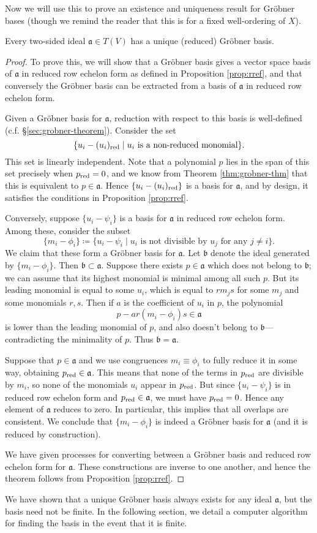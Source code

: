 Now we will use this to prove an existence and uniqueness result for Gr\"obner bases (though we remind the reader that this is for a fixed well-ordering of $X$).
\begin{thm}\label{thm:exist+unique}
	Every two-sided ideal $\mathfrak{a}\in T(V)$ has a unique (reduced) Gr\"obner basis.
\end{thm}
\begin{proof}
	To prove this, we will show that a Gr\"obner basis gives a vector space basis of $\mathfrak{a}$ in reduced row echelon form as defined in Proposition \ref{prop:rref}, and that conversely the Gr\"obner basis can be extracted from a basis of $\mathfrak{a}$ in reduced row echelon form.
	
	Given a Gr\"obner basis for $\mathfrak{a}$, reduction with respect to this basis is well-defined (c.f. \S\ref{sec:grobner-theorem}). Consider the set
	\[
		\{u_i - (u_i)_{\mathrm{red}} \mid u_i \text{ is a non-reduced monomial}\}.
	\]
	This set is linearly independent. Note that a polynomial $p$ lies in the span of this set precisely when $p_{\mathrm{red}} = 0$, and we know from Theorem \ref{thm:grobner-thm} that this is equivalent to $p \in \mathfrak{a}$. Hence $\{u_i - (u_i)_{\mathrm{red}}\}$ is a basis for $\mathfrak{a}$, and by design, it satisfies the conditions in Proposition \ref{prop:rref}.
	
	Conversely, suppose $\{u_i - \psi_i\}$ is a basis for $\mathfrak{a}$ in reduced row echelon form. Among these, consider the subset
	\[
		\{m_i - \phi_i\} \coloneqq \{u_i - \psi_i \mid u_i \text{ is not divisible by } u_j \text{ for any }j\neq i\}.
	\]
	We claim that these form a Gr\"obner basis for $\mathfrak{a}$. Let $\mathfrak{b}$ denote the ideal generated by $\{m_i -\phi_i\}$. Then $\mathfrak{b} \subset \mathfrak{a}$. Suppose there exists $p\in \mathfrak{a}$ which does not belong to $\mathfrak{b}$; we can assume that its highest monomial is minimal among all such $p$. But its leading monomial is equal to some $u_i$, which is equal to $rm_j s$ for some $m_j$ and some monomials $r,s$. Then if $a$ is the coefficient of $u_i$ in $p$, the polynomial
	\[
		p - ar(m_i -\phi_i)s \in \mathfrak{a}
	\]
	is lower than the leading monomial of $p$, and also doesn't belong to $\mathfrak{b}$---contradicting the minimality of $p$. Thus $\mathfrak{b} = \mathfrak{a}$.
	
	Suppose that $p\in \mathfrak{a}$ and we use congruences $m_i \equiv \phi_i$ to fully reduce it in some way, obtaining $p_{\mathrm{red}} \in \mathfrak{a}$. This means that none of the terms in $p_{\mathrm{red}}$ are divisible by $m_i$, so none of the monomials $u_i$ appear in $p_{\mathrm{red}}$. But since $\{u_i - \psi_i\}$ is in reduced row echelon form and $p_{\mathrm{red}} \in \mathfrak{a}$, we must have $p_{\mathrm{red}} = 0$. Hence any element of $\mathfrak{a}$ reduces to zero. In particular, this implies that all overlaps are consistent. We conclude that $\{m_i - \phi_i\}$ is indeed a Gr\"obner basis for $\mathfrak{a}$ (and it is reduced by construction).
	
	We have given processes for converting between a Gr\"obner basis and reduced row echelon form for $\mathfrak{a}$. These constructions are inverse to one another, and hence the theorem follows from Proposition \ref{prop:rref}.
\end{proof}
We have shown that a unique Gr\"obner basis always exists for any ideal $\mathfrak{a}$, but the basis need not be finite. In the following section, we detail a computer algorithm for finding the basis in the event that it is finite.